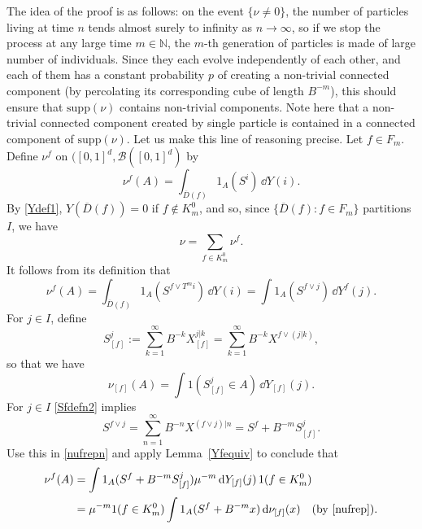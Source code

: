 \documentclass[12pt]{article}
\makeatletter
\renewenvironment{proof}[1][\proofname]{%
\par\pushQED{\qed}\normalfont%
\topsep6\p@\@plus6\p@\relax
\trivlist\item[\hskip\labelsep\bfseries#1\@addpunct{.}]%
\ignorespaces
}{%
\popQED\endtrivlist\@endpefalse
}
\numberwithin{theorem}{section}
\theoremstyle{def}
\numberwithin{equation}{section}
\newcommand{\N}{\mathbb{N}}
\newcommand{\cB}{\mathcal B}
\newcommand{\supp}{\mathrm{supp}}
\makeatother
\begin{document}
\begin{proof}[Proof of Lemma~\ref{lem:01}]
The idea of the proof is as follows: on the event $\{\nu \neq 0\}$, the number of particles living at time $n$ tends almost surely to infinity as $n\rightarrow \infty$, so if we stop the process at any large time $m\in \N$, the $m$-th generation of particles is made of large number of individuals.  
Since they each evolve independently of each other, and each of them has a constant probability $p$ of creating a non-trivial connected component (by percolating its corresponding cube of length $B^{-m}$), this should ensure that $\supp(\nu)$ contains non-trivial components. 
Note here that a non-trivial connected component created by single particle is contained in a connected component of $\supp(\nu)$.
Let us make this line of reasoning precise.
 Let $f\in F_m$.  Define $\nu^f$ on $([0,1]^d,\cB([0,1]^d)$ by
\begin{equation*}
	 \nu^f(A)=\int_{\overline D(f)}1_A(S^i)\,\dd Y(i).
\end{equation*}
By \eqref{Ydef1}, $Y(\overline D(f))=0$ if $f\notin K^0_m$, and so, since $\{\overline D(f):f\in F_m\}$ partitions $I$, we have
\begin{equation}\label{nudecompn}
\nu=\sum_{f\in K^0_m}\nu^f.
\end{equation}
It follows from its definition that 
\begin{equation}\label{nufrepn}
\nu^f(A)=\int_{\overline D(f)}1_A(S^{f\vee T^mi})\,\dd Y(i)=\int 1_A(S^{f\vee j})\,\dd Y^f(j).
\end{equation}
For $j\in I$, define
\begin{equation}\label{Sfdefn2}
S^j_{[f]}:=\sum_{k=1}^\infty B^{-k}X_{[f]}^{j|k}=\sum_{k=1}^\infty B^{-k}X^{f\vee(j|k)},
\end{equation}
so that we have
\begin{equation}\label{nufrep}
\nu_{[f]}(A)=\int 1(S^j_{[f]}\in A)\, \dd Y_{[f]}(j).
\end{equation}
For $j\in I$ \eqref{Sfdefn2} implies
\begin{equation*}
S^{f\vee j}=\sum_{n=1}^\infty B^{-n}X^{(f\vee j)|n}=S^f+B^{-m}S^j_{[f]}.
\end{equation*}
Use this in \eqref{nufrepn} and apply Lemma~\ref{Yfequiv} to conclude that
\begin{align*}\nu^f(A)&=\int 1_A(S^f+B^{-m}S^j_{[f]})\mu^{-m}\,\dd Y_{[f]}(j)\, 1(f\in K^0_m)\\
&=\mu^{-m}1(f\in K^0_m)\int 1_A(S^f+B^{-m}x)\,\dd \nu_{[f]}(x)\quad\text{(by \eqref{nufrep})}.

\end{align*}
\end{proof}
\end{document}
